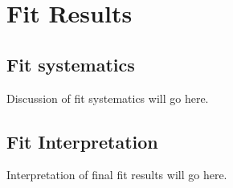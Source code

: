 \section{Fit Results}
\label{sec:FitResults}

\subsection{Fit systematics}
\label{sec:FitSystematics}

Discussion of fit systematics will go here.

\subsection{Fit Interpretation}
\label{sec:FitInterpretation}

Interpretation of final fit results will go here.

